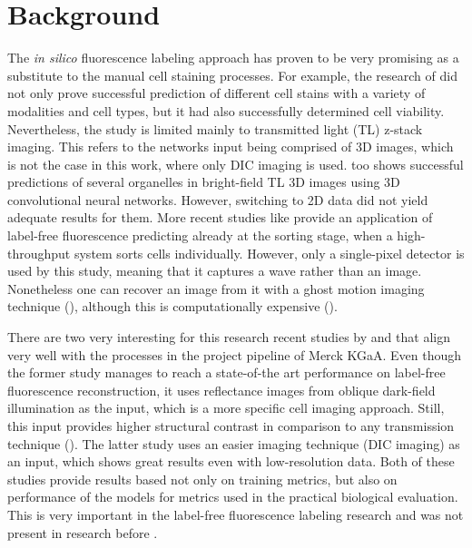 \section{Background}

The \textit{in silico} fluorescence labeling approach has proven to be very promising as a substitute to the manual cell staining processes. For example, the research of \cite{Christiansen_2018} did not only prove successful prediction of different cell stains with a variety of modalities and cell types, but it had also successfully determined cell viability. Nevertheless, the study is limited mainly to transmitted light (TL) z-stack imaging. This refers to the networks input being comprised of 3D images, which is not the case in this work, where only DIC imaging is used. \cite{Ounkomol_2018} too shows successful predictions of several organelles in bright-field TL 3D images using 3D convolutional neural networks. However, switching to 2D data did not yield adequate results for them. More recent studies like \cite{Ugawa_2021} provide an application of label-free fluorescence predicting already at the sorting stage, when a high-throughput system sorts cells individually. However, only a single-pixel detector is used by this study, meaning that it captures a wave rather than an image. Nonetheless one can recover an image from it with a ghost motion imaging technique (\cite{Bromberg_2009}), although this is computationally expensive (\cite{Sadao_2018}).
    
There are two very interesting for this research recent studies by \cite{Cheng_2021} and \cite{Lachance_2020} that align very well with the processes in the project pipeline of Merck KGaA. Even though the former study manages to reach a state-of-the art performance on label-free fluorescence reconstruction, it uses reflectance images from oblique dark-field illumination as the input, which is a more specific cell imaging approach. Still, this input provides higher structural contrast in comparison to any transmission technique (\cite{Boustany_2010}). The latter study uses an easier imaging technique (DIC imaging) as an input, which shows great results even with low-resolution data. Both of these studies provide results based not only on training metrics, but also on performance of the models for metrics used in the practical biological evaluation. This is very important in the label-free fluorescence labeling research and was not present in research before \cite{Lachance_2020}.
    
